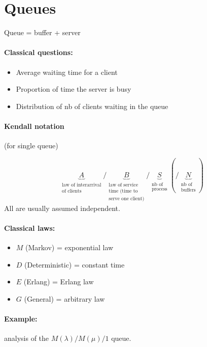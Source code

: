 \documentclass{article}
\begin{document}
\section{Queues}
Queue = buffer + server

\paragraph{Classical questions:}
\begin{itemize}
\item Average waiting time for a client
\item Proportion of time the server is busy
\item Distribution of nb of clients waiting in the queue
\end{itemize}

\paragraph{Kendall notation} (for single queue)

\[\underbrace{A}_{\substack{\text{law of interarrival}\\\text{of clients}}} / \underbrace{B}_{\substack{\text{law of service}\\\text{time (time to}\\\text{serve one client)}}} / \underbrace{S}_{\substack{\text{nb of}\\\text{process}}}  (/ \underbrace{N}_{\substack{\text{nb of}\\\text{buffers}}})
\]
All are usually assumed independent.


\paragraph{Classical laws:}
\begin{itemize}
\item $M$ (Markov) = exponential law
\item $D$ (Deterministic) = constant time
\item $E$ (Erlang) = Erlang law
\item $G$ (General) = arbitrary law
\end{itemize}




\paragraph{Example:} analysis of the $M(\lambda) / M(\mu)/1$ queue.
\end{document}
